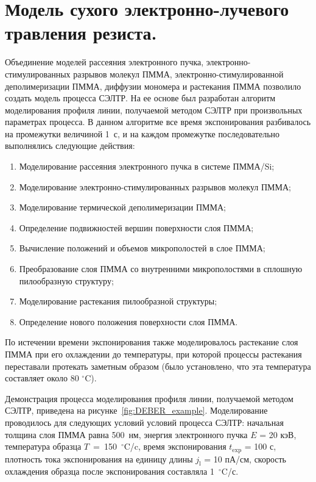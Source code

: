 \section{Модель сухого электронно-лучевого травления резиста.}

Объединение моделей рассеяния электронного пучка, электронно-стимулированных разрывов молекул ПММА, электронно-стимулированной деполимеризации ПММА, диффузии мономера и растекания ПММА позволило создать модель процесса СЭЛТР. На ее основе был разработан алгоритм моделирования профиля линии, получаемой методом СЭЛТР при произвольных параметрах процесса. В данном алгоритме все время экспонирования разбивалось на промежутки величиной 1~с, и на каждом промежутке последовательно выполнялись следующие действия:

\begin{enumerate}
	\item Моделирование рассеяния электронного пучка в системе ПММА/Si;
	\item Моделирование электронно-стимулированных разрывов молекул \linebreak ПММА;
	\item Моделирование термической деполимеризации ПММА;
	\item Определение подвижностей вершин поверхности слоя ПММА;
	\item Вычисление положений и объемов микрополостей в слое ПММА;
	\item Преобразование слоя ПММА со внутренними микрополостями в сплошную пилообразную структуру;
	\item Моделирование растекания пилообразной структуры;
	\item Определение нового положения поверхности слоя ПММА.
\end{enumerate}

По истечении времени экспонирования также моделировалось растекание слоя ПММА при его охлаждении до температуры, при которой процессы растекания переставали протекать заметным образом (было установлено, что эта температура составляет около 80 $^\circ$C).

Демонстрация процесса моделирования профиля линии, получаемой методом СЭЛТР, приведена на рисунке~\ref{fig:DEBER_example}. Моделирование проводилось для следующих условий условий процесса СЭЛТР: начальная толщина слоя ПММА равна 500~нм, энергия электронного пучка $E$ = 20 кэВ, температура образца $T$~=~150~$^{\circ}$C/c, время экспонирования $t_\mathrm{exp}$ = 100 с, плотность тока экспонирования на единицу длины $j_\mathrm{l}$ = 10 пА/см, скорость охлаждения образца после экспонирования составляла 1~$^{\circ}$C/с.

